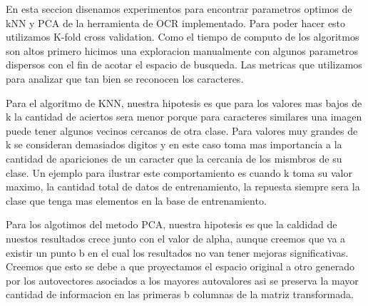 En esta seccion disenamos experimentos para encontrar parametros optimos  de kNN y PCA de la herramienta de OCR implementado. Para poder hacer esto utilizamos K-fold cross validation.
Como el tiempo de computo de los algoritmos son altos primero hicimos una exploracion manualmente con algunos parametros dispersos con el fin de acotar el espacio de busqueda. Las metricas que utilizamos para analizar que tan bien se reconocen los caracteres.

Para el algoritmo de KNN, nuestra hipotesis es que para los valores mas bajos de k la cantidad de aciertos sera menor porque para caracteres similares una imagen puede tener algunos vecinos cercanos de otra clase. Para valores muy grandes de k se consideran demasiados digitos y en este caso toma mas importancia a la cantidad de apariciones de un caracter que la cercania de los mismbros de su clase. Un ejemplo para ilustrar este comportamiento es cuando k toma su valor maximo, la cantidad total de datos de entrenamiento, la repuesta siempre sera la clase que tenga mas elementos en la base de entrenamiento.

Para los algotimos del metodo PCA, nuestra hipotesis es que la caldidad de nuestos resultados crece junto con el valor de alpha, aunque creemos que va a existir un punto b en el cual los resultados no van tener mejoras significativas. Creemos que esto se debe a que proyectamos el espacio original a otro generado por los autovectores asociados a los mayores autovalores asi se preserva la mayor cantidad de informacion en las primeras b columnas de la matriz transformada.